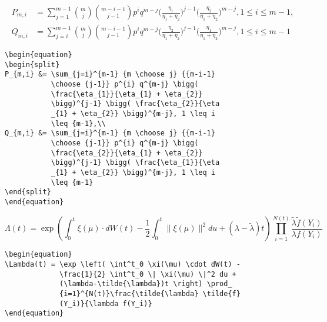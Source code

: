 \documentclass[12pt, a4paper]{article}
\begin{document}
\begin{equation}
\begin{split}
P_{m,i} &= \sum_{j=1}^{m-1} {m \choose j} {{m-i-1} \choose {j-1}} p^{i} q^{m-j} \bigg( \frac{\eta_{1}}{\eta_{1} + \eta_{2}} \bigg)^{j-1} \bigg( \frac{\eta_{2}}{\eta_{1} + \eta_{2}} \bigg)^{m-j}, 1 \leq i \leq {m-1}, \\
Q_{m,i} &= \sum_{j=i}^{m-1} {m \choose j} {{m-i-1} \choose {j-1}} p^{i} q^{m-j} \bigg( \frac{\eta_{2}}{\eta_{1} + \eta_{2}} \bigg)^{j-1} \bigg( \frac{\eta_{1}}{\eta_{1} + \eta_{2}} \bigg)^{m-j}, 1 \leq i \leq {m-1} 
\end{split}
\end{equation}
\begin{lstlisting}
\begin{equation}
\begin{split}
P_{m,i} &= \sum_{j=i}^{m-1} {m \choose j} {{m-i-1}
           \choose {j-1}} p^{i} q^{m-j} \bigg(
           \frac{\eta_{1}}{\eta_{1} + \eta_{2}}
           \bigg)^{j-1} \bigg( \frac{\eta_{2}}{\eta
           _{1} + \eta_{2}} \bigg)^{m-j}, 1 \leq i 
           \leq {m-1},\\
Q_{m,i} &= \sum_{j=i}^{m-1} {m \choose j} {{m-i-1}
           \choose {j-1}} p^{i} q^{m-j} \bigg(
           \frac{\eta_{2}}{\eta_{1} + \eta_{2}} 
           \bigg)^{j-1} \bigg( \frac{\eta_{1}}{\eta
           _{1} + \eta_{2}} \bigg)^{m-j}, 1 \leq i
           \leq {m-1} 
\end{split}
\end{equation}
\end{lstlisting}

\begin{equation}
\Lambda(t) = \exp \left( \int^t_0 \xi(\mu) \cdot dW(t) - \frac{1}{2} \int^t_0 \| \xi(\mu) \|^2 du + (\lambda-\tilde{\lambda})t \right) \prod_{i=1}^{N(t)}\frac{\tilde{\lambda} \tilde{f}(Y_i)}{\lambda f(Y_i)}
\end{equation}

\begin{lstlisting}
\begin{equation}
\Lambda(t) = \exp \left( \int^t_0 \xi(\mu) \cdot dW(t) -
             \frac{1}{2} \int^t_0 \| \xi(\mu) \|^2 du +
             (\lambda-\tilde{\lambda})t \right) \prod_
             {i=1}^{N(t)}\frac{\tilde{\lambda} \tilde{f}
             (Y_i)}{\lambda f(Y_i)}
\end{equation}
\end{lstlisting}
\end{document}
